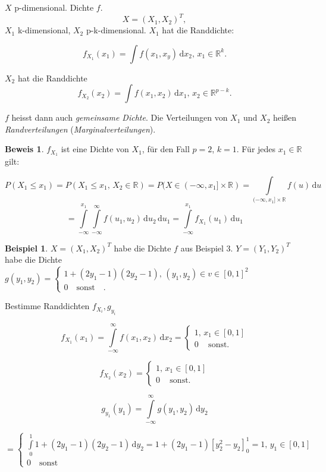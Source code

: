 \documentclass[12pt, a4paper]{article}
\theoremstyle{plain}
\theoremstyle{definition}
\newtheorem{beispiel}[thm]{Beispiel}
\newtheorem*{beweis}{Beweis}
\newcommand{\R}{\mathbb{R}}
\newcommand{\1}{\mathds{1}}
\renewcommand{\d}{\,\mathrm{d}}
\providecommand{\mtext}[1]{\quad \text{#1} \quad}
\begin{document}
$X$ p-dimensional. Dichte $f$. \[ X = (X_1, X_2)^T ,\] $ X_1 $ k-dimensional, $X_2$ p-k-dimensional. $X_1$ hat die Randdichte:

\[ f_{X_1}(x_1) = \int f(x_1, x_y) \d x_2, \, x_1 \in \R^k .\]

$X_2$ hat die Randdichte \[ f_{X_2} (x_2) = \int f(x_1, x_2) \d x_1, \, x_2 \in \R^{p-k}. \]


$f$ heisst dann auch \emph{gemeinsame Dichte}. Die Verteilungen von $X_1$ und $X_2$ heißen \emph{Randverteilungen} (\emph{Marginalverteilungen}).\\




\begin{beweis}
$f_{X_1}$ ist eine Dichte von $X_1$, für den Fall $p=2$, $k=1$. Für jedes $x_1 \in \R$ gilt:

\[ P(X_1 \leq x_1) = P(X_1 \leq x_1, \, X_2 \in \R) = P( X \in (- \infty, x_1 ] \times \R) = \int\limits_{(-\infty, x_1] \times \R} f(u) \d u \]
\[= \int\limits_{-\infty}^{x_1} \int\limits_{-\infty}^{\infty} f(u_1, u_2) \d u_2 \d u_1  =  \int\limits_{-\infty}^{x_1} f_{X_1} (u_1)\d u_1 \]

\end{beweis}
	
\begin{beispiel}
$ X = (X_1, X_2)^T $ habe die Dichte $f$ aus Beispiel 3.
$ Y = (Y_1, Y_2)^T$ habe die Dichte $g(y_1, y_2) = \begin{cases} 1+(2 y_1 - 1)(2y_2 - 1), \, (y_1, y_2) \in v \in [0,1]^2 \\ 0 \mtext{sonst}.\end{cases}$

Bestimme Randdichten $f_{X_i}, g_{y_i}$

\end{beispiel}

\[ f_{X_1}(x_1) = \int\limits_{-\infty}^{\infty}f(x_1, x_2) \d x_2 = 
\begin{cases} 1, \, x_1 \in [0,1] \\
0 \, \mtext{sonst.} \end{cases} \]

\[ f_{X_2}(x_2) = 
\begin{cases} 1, \, x_1 \in [0,1] \\
0 \, \mtext{sonst.} \end{cases} \]


\[ g_{y_1} (y_1) = \int\limits_{-\infty}^{\infty} g(y_1, y_2) \d y_2  \]

\[= \begin{cases} \int\limits_0^1 1+(2 y_1 - 1)(2y_2 - 1) \d y_2 = 1+ (2y_1 - 1) [y_2^2 - y_2]_0^1 = 1, \, y_1 \in [0,1]  \\ 0 \mtext{sonst} \end{cases} \]
\end{document}
